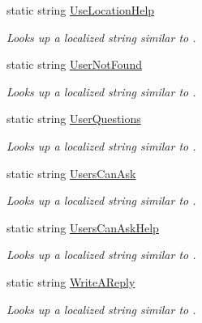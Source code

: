 \begin{DoxyCompactItemize}
static string \hyperlink{class_wis_r_1_1_app___resources_1_1_resource_a90ae5d95bf661775ab931004cf61b5b3}{Use\+Location\+Help}
\begin{DoxyCompactList}\small\item\em Looks up a localized string similar to . \end{DoxyCompactList}\item 
static string \hyperlink{class_wis_r_1_1_app___resources_1_1_resource_a78347cb998ff28dfd8b16c441c3b8a70}{User\+Not\+Found}
\begin{DoxyCompactList}\small\item\em Looks up a localized string similar to . \end{DoxyCompactList}\item 
static string \hyperlink{class_wis_r_1_1_app___resources_1_1_resource_a06182578f3dc92dca84ff002ac32bac3}{User\+Questions}
\begin{DoxyCompactList}\small\item\em Looks up a localized string similar to . \end{DoxyCompactList}\item 
static string \hyperlink{class_wis_r_1_1_app___resources_1_1_resource_ab6e4f41b05fa2d5479292ccd2a2bd33a}{Users\+Can\+Ask}
\begin{DoxyCompactList}\small\item\em Looks up a localized string similar to . \end{DoxyCompactList}\item 
static string \hyperlink{class_wis_r_1_1_app___resources_1_1_resource_ad1956debecc96028026ca9a568e817a9}{Users\+Can\+Ask\+Help}
\begin{DoxyCompactList}\small\item\em Looks up a localized string similar to . \end{DoxyCompactList}\item 
static string \hyperlink{class_wis_r_1_1_app___resources_1_1_resource_aad658f89169bff01635a5a1a7ff17d99}{Write\+A\+Reply}
\begin{DoxyCompactList}\small\item\em Looks up a localized string similar to . \end{DoxyCompactList}\item 

\end{DoxyCompactItemize}
